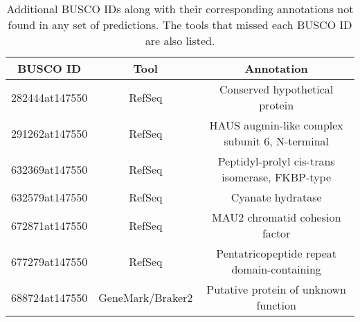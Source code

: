 \begin{table}[h]
  \centering
  \begin{tabular}{|c|c|c|}
    \hline
    BUSCO ID & Tool & Annotation \\ \hline
    282444at147550 & RefSeq & Conserved hypothetical protein \\ \hline
    291262at147550 & RefSeq & HAUS augmin-like complex subunit 6, N-terminal \\ \hline
    632369at147550 & RefSeq & Peptidyl-prolyl cis-trans isomerase, FKBP-type \\ \hline
    632579at147550 & RefSeq & Cyanate hydratase \\ \hline
    672871at147550 & RefSeq & MAU2 chromatid cohesion factor \\ \hline
    677279at147550 & RefSeq & Pentatricopeptide repeat domain-containing \\ \hline
    688724at147550 & GeneMark/Braker2 & Putative protein of unknown function \\ \hline
  \end{tabular}
  \caption{Additional BUSCO IDs along with their corresponding annotations not found in any set of predictions. The tools that missed each BUSCO ID are also listed.}
  \label{table:missed-all-gf}
\end{table}




